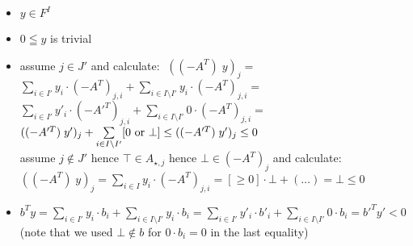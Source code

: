 \documentclass[]{article}
\begin{document}
\begin{itemize}
\begin{itemize}
	\item $ y \in F^I $
	\item $0 \leqq y$ is trivial
	\item assume $j \in J'$ and calculate: $\; ((-A^T)\; y)_j = $\\
	$ \sum\limits_{i \in I'} y_i \cdot (-A^T)_{j,i} + \sum\limits_{i \in I \setminus I'} y_i \cdot (-A^T)_{j,i} = $\\
	$ \sum\limits_{i \in I'} y'_i \cdot (-A'^T)_{j,i} + \sum\limits_{i \in I \setminus I'} 0 \cdot (-A^T)_{j,i} = $\\
	$ ((-A'^T)\; y')_j + \sum\limits_{i \in I \setminus I'} [0 \textup{~or~} \bot] \le ((-A'^T)\; y')_j \le 0  $\\
	assume $j \notin J'$ hence $\top \in A_{\star, j}$ hence $\bot \in (-A^T)_{j}$ and calculate:
	$ ((-A^T)\; y)_j = \sum\limits_{i \in I} y_i \cdot (-A^T)_{j,i} = [\ge 0] \cdot \bot + (\dots) = \bot \le 0 $
	\item $ b^T y
	= \sum\limits_{i \in I'} y_i \cdot b_i + \sum\limits_{i \in I \setminus I'} y_i \cdot b_i
	= \sum\limits_{i \in I'} y'_i \cdot b'_i + \sum\limits_{i \in I \setminus I'} 0 \cdot b_i
	= b'^T y' < 0 $
	(note that we used $\bot \notin b$ for $0 \cdot b_i = 0$ in the last equality)
\end{itemize}
\end{itemize}
\end{document}
